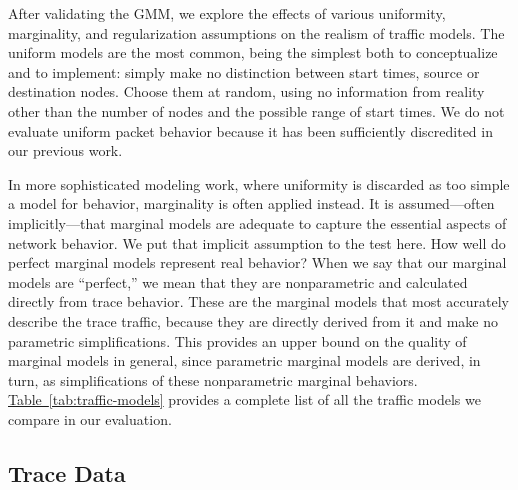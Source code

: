 \documentclass[twocolumn,final]{svjour3}
\newcommand{\caps}[1]{{\small{#1}}}
\newcommand{\Table}[1]{\hyperref[tab:#1]{Table~\ref*{tab:#1}}}
\begin{document}
After validating the \caps{GMM}, we explore the effects of various uniformity, marginality, and regularization assumptions on the realism of traffic models. The uniform models are the most common, being the simplest both to conceptualize and to implement: simply make no distinction between start times, source or destination nodes. Choose them at random, using no information from reality other than the number of nodes and the possible range of start times. We do not evaluate uniform packet behavior because it has been sufficiently discredited in our previous work.

In more sophisticated modeling work, where uniformity is discarded as too simple a model for behavior, marginality is often applied instead. It is assumed---often implicitly---that marginal models are adequate to capture the essential aspects of network behavior. We put that implicit assumption to the test here. How well do perfect marginal models represent real behavior? When we say that our marginal models are ``perfect,'' we mean that they are nonparametric and calculated directly from trace behavior. These are the marginal models that most accurately describe the trace traffic, because they are directly derived from it and make no parametric simplifications. This provides an upper bound on the quality of marginal models in general, since parametric marginal models are derived, in turn, as simplifications of these nonparametric marginal behaviors. \Table{traffic-models} provides a complete list of all the traffic models we compare in our evaluation.


\subsection{Trace Data}\label{sec:trace-data}
\end{document}
